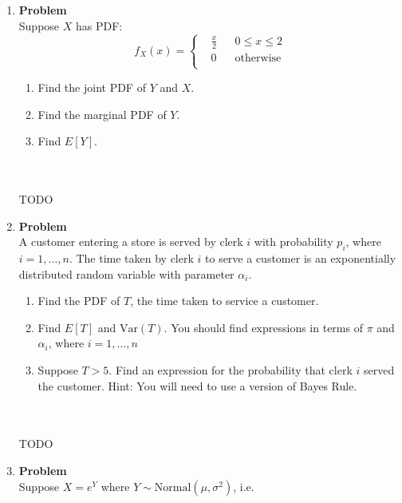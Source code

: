 \documentclass[12pt]{article}
\newenvironment{Ex}{\textbf{Problem}\vspace{.75em}\\}{}
\begin{document}
\begin{enumerate}
\begin{Ex}
  \end{Ex}
\item 
  \begin{Ex}
    Suppose $X$ has PDF:
    \begin{equation}
      \label{eq:3-question}
      f_X(x) = \left\{
        \begin{aligned}
          &\frac{x}{2} && 0\le x\le 2 \\
          &0 && \text{otherwise} \\
        \end{aligned}\right.
    \end{equation}
    \begin{enumerate}
    \item Find the joint PDF of $Y$ and $X$. 
    \item Find the marginal PDF of $Y$. 
    \item Find $E[Y]$.
    \end{enumerate}
    \begin{solution} \hfill \\\\ {\huge TODO}
    \end{solution}
  \end{Ex}
\item
  \begin{Ex}
    A customer entering a store is served by clerk $i$ with
    probability $p_i$, where $i = 1,\ldots,n$. The time taken by clerk
    $i$ to serve a customer is an exponentially distributed random
    variable with parameter $\alpha_i$.
    \begin{enumerate}
    \item Find the PDF of $T$, the time taken to service a customer.
    \item Find $E[T]$ and $\text{Var}(T)$. You should find expressions
      in terms of $\pi$ and $\alpha_i$, where $i = 1,\ldots,n$
    \item Suppose $T > 5$. Find an expression for the probability that
      clerk $i$ served the customer. Hint: You will need to use a
      version of Bayes Rule.
    \end{enumerate}
    \begin{solution} \hfill \\\\ {\huge TODO}
    \end{solution}
  \end{Ex}
\item
  \begin{Ex}
    Suppose $X = e^Y$ where $Y\sim \text{Normal}(\mu, \sigma^2)$, i.e.

\end{Ex}
\end{enumerate}
\end{document}
